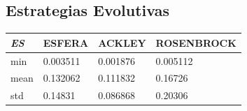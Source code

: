 \documentclass{article}
\begin{document}
\newpage
\subsection{Estrategias Evolutivas}
\begin{table}[H]
  \centering
  \begin{tabular}{|l|l|l|l|}
    \hline
    \textit{\textbf{ES}} & ESFERA   & ACKLEY   & ROSENBROCK \\ \hline
    min                  & 0.003511 & 0.001876 & 0.005112   \\ \hline
    mean                 & 0.132062 & 0.111832 & 0.16726    \\ \hline
    std                  & 0.14831  & 0.086868 & 0.20306    \\ \hline
  \end{tabular}
\end{table}
\end{document}
